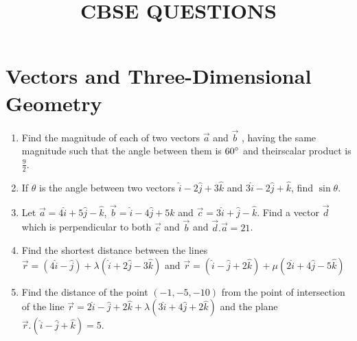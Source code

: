 \documentclass{article}
\providecommand{\brak}[1]{\ensuremath{\left(#1\right)}}
\begin{document}
\title{\textbf{CBSE QUESTIONS}}
\date{}
\maketitle{}
\section{Vectors and Three-Dimensional Geometry}
\begin{enumerate}
\item Find the magnitude of each of two vectors $\vec{a}$ and $\vec{b}$ , having the same magnitude such that the angle  between them is $60\degree{}$ and theirscalar product is $\frac{9}{2}$.
\item If $\theta$ is the angle between two vectors $\hat{i}-2\hat{j}+3\hat{k}$ and $3\hat{i}-2\hat{j}+\hat{k}$, find $\sin\theta$.
\item Let $\vec{a}=4\hat{i}+5\hat{j}-\hat{k}$, $\vec{b}=\hat{i}-4\hat{j}+5\hat{k}$ and $\vec{c}=3\hat{i}+\hat{j}-\hat{k}$. Find a vector $\vec{d}$ which is perpendicular to both $\vec{c}$ and $\vec{b}$ and $\vec{d}.\vec{a}=21$.
\item Find the shortest distance between the lines \\ $\vec{r} = \brak{4\hat{i}-\hat{j}}+\lambda\brak{\hat{i}+2\hat{j}-3\hat{k}}$ and $\vec{r} = \brak{\hat{i}-\hat{j}+2\hat{k}}+ \mu\brak{2\hat{i}+4\hat{j}-5\hat{k}}$
\item Find the distance of the point \brak{-1,-5,-10} from the point of intersection of the line $\vec{r}=2\hat{i}-\hat{j}+2\hat{k}+\lambda{\brak{3\hat{i}+4\hat{j}+2\hat{k}}}$ and the plane $\vec{r}.\brak{\hat{i}-\hat{j}+\hat{k}}=5.$
\end{enumerate}
\end{document}
